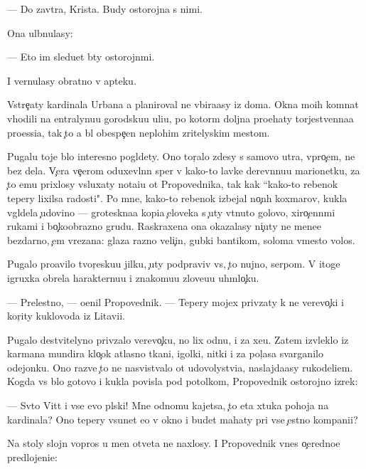 \documentclass[10pt]{book}
\begin{document}
— Do zavtra, Krista. Budy ostorojna s nimi.

Ona ul{\yi}bnulasy:

— Eto im sledu{\y}et b{\yi}ty ostorojn{\yi}mi.

I vernulasy obratno v apteku.

Vstre{\c}aty kardinala Urbana {\y}a planiroval ne v{\yi}bira{\y}asy iz doma. Okna mo{\y}ih komnat v{\yi}hodili na {\q}entralynu{\y}u gorodsku{\y}u uli{\q}u, po kotor{\yi}m doljna pro{\y}ehaty torjestvenna{\y}a pro{\q}essi{\y}a, tak {\c}to {\y}a b{\yi}l obespe{\c}en neplohim zritelyskim mestom.

Pugalu toje b{\yi}lo interesno pogl{\ia}dety. Ono tor{\c}alo zdesy s samovo utra, vpro{\c}em, ne bez dela. V{\c}era ve{\c}erom oduxevl{\e}nn{\yi}{\y} sper v kako{\y}-to lavke derev{\ia}nnu{\y}u marionetku, za {\c}to {\y}emu prixlosy v{\yi}sluxaty nota{\q}i{\y}u ot Propovednika, tak kak ``kako{\y}-to rebenok tepery lixilsa radosti". Po mne, kako{\y}-to rebenok izbejal no{\c}n{\yi}h koxmarov, kukla v{\yi}gl{\ia}dela {\c}udovi{\x}no — groteskna{\y}a kopi{\y}a {\c}eloveka s {\c}uty v{\yi}t{\ia}nuto{\y} golovo{\y}, xiro{\c}enn{\yi}mi rukami i bo{\c}koobrazno{\y} grud{\y}u. Raskraxena ona okazalasy ni{\c}uty ne mene{\y}e bezdarno, {\c}em v{\yi}rezana: glaza razno{\y} veli{\c}in{\yi}, gubki bantikom, soloma vmesto volos.

Pugalo pro{\y}avilo tvor{\c}esku{\y}u jilku, {\c}uty podpraviv vs{\e}, {\c}to nujno, serpom. V itoge igruxka obrela harakternu{\y}u i znakomu{\y}u zlove{\x}u{\y}u uhm{\yi}lo{\c}ku.

— Prelestno, — o{\q}enil Propovednik. — Tepery mojex priv{\ia}zaty k ne{\y} verevo{\c}ki i kor{\c}ity kuklovoda iz Litavi{\y}i.

Pugalo de{\y}stvitelyno priv{\ia}zalo verevo{\c}ku, no lix odnu, i za xe{\y}u. Zatem izvleklo iz karmana mundira klo{\c}ok atlasno{\y} tkani, igolki, nitki i za pol{\c}asa svarganilo odejonku. Ono razve {\c}to ne nasvist{\yi}valo ot udovolystvi{\y}a, naslajda{\y}asy rukodeli{\y}em. Kogda vs{\e} b{\yi}lo gotovo i kukla povisla pod potolkom, Propovednik ostorojno izrek:

— Sv{\ia}to{\y} Vitt i vse {\y}evo pl{\ia}ski! Mne odnomu kajetsa, {\c}to eta xtuka pohoja na kardinala? Ono tepery v{\yi}sunet {\y}e{\y}o v okno i budet mahaty pri vse{\y} {\c}estno{\y} kompani{\y}i?

Na stoly slojn{\yi}{\y} vopros u men{\ia} otveta ne naxlosy. I Propovednik vnes o{\c}eredno{\y}e predlojeni{\y}e:
\end{document}
